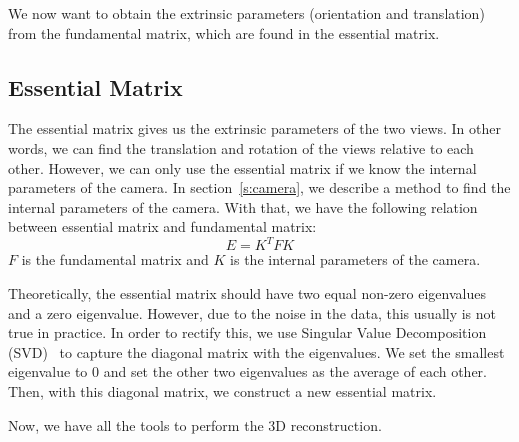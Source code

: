 We now want to obtain the extrinsic parameters (orientation and translation) from the fundamental matrix, which are found in the essential matrix.

\subsection{Essential Matrix}
The essential matrix gives us the extrinsic parameters of the two views. In other words, we can find the translation and rotation of the views relative to each other. However, we can only use the essential matrix if we know the internal parameters of the camera. In section~\ref{s:camera}, we describe a method to find the internal parameters of the camera. With that, we have the following relation between essential matrix and fundamental matrix:
\begin{equation}
E = K^TFK
\end{equation}
$F$ is the fundamental matrix and $K$ is the internal parameters of the camera.

Theoretically, the essential matrix should have two equal non-zero eigenvalues and a zero eigenvalue. However, due to the noise in the data, this usually is not true in practice. In order to rectify this, we use Singular Value Decomposition (SVD)~\cite{svd} to capture the diagonal matrix with the eigenvalues. We set the smallest eigenvalue to 0 and set the other two eigenvalues as the average of each other. Then, with this diagonal matrix, we construct a new essential matrix.

Now, we have all the tools to perform the 3D reconstruction.
